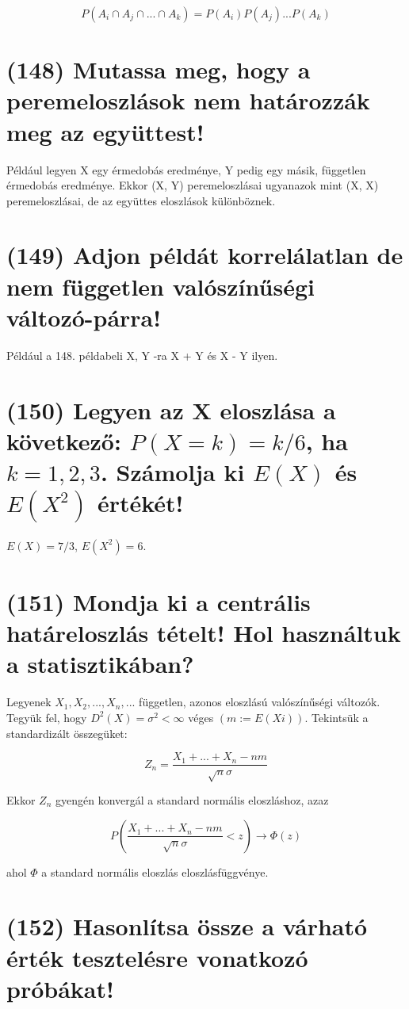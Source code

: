 \documentclass[12p]{article}
\begin{document}
$$P(A_i \cap A_j \cap ... \cap A_k) = P(A_i)P(A_j)...P(A_k)$$

\section{(148) Mutassa meg, hogy a peremeloszlások nem határozzák meg az együttest!}

Például legyen X egy érmedobás eredménye, Y pedig egy másik, független érmedobás eredménye. Ekkor (X, Y) peremeloszlásai ugyanazok mint (X, X) peremeloszlásai, de az együttes eloszlások különböznek.

\section{(149) Adjon példát korrelálatlan de nem független valószínűségi változó-párra!}

Például a 148. példabeli X, Y -ra X + Y és X - Y ilyen.

\section{(150) Legyen az X eloszlása a következő: $P(X = k) = k/6$, ha $k = 1, 2, 3$. Számolja ki $E(X)$ és $E(X^2)$ értékét!}

$E(X) = 7/3$, $E(X^2) = 6$.

\section{(151) Mondja ki a centrális határeloszlás tételt! Hol használtuk a statisztikában?}

Legyenek $X_1 , X_2 ,..., X_n ,...$ független, azonos eloszlású valószínűségi változók. Tegyük fel, hogy $D^2(X) = \sigma^2 < \infty$ véges $(m:=E(Xi))$. Tekintsük a standardizált összegüket:

$$Z_n = \frac{X_1 + ... + X_n -nm}{\sqrt{n}\sigma}$$

Ekkor $Z_n$ gyengén konvergál a standard normális eloszláshoz,
azaz

$$P(\frac{X_1 + ... + X_n - nm}{\sqrt{n}\sigma} < z) \rightarrow \Phi(z)$$

ahol $\Phi$ a standard normális eloszlás eloszlásfüggvénye.

\section{(152) Hasonlítsa össze a várható érték tesztelésre vonatkozó próbákat!}
\end{document}
